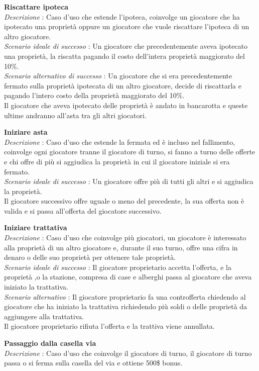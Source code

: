 \documentclass[a4paper]{article}
\begin{document}
\textbf{Riscattare ipoteca}\\
\textit{Descrizione} : Caso d'uso che estende l'ipoteca, coinvolge un giocatore che ha ipotecato una proprietà oppure un giocatore che vuole riscattare l'ipoteca di un altro giocatore.\\
\textit{Scenario ideale di successo} : Un giocatore che precedentemente aveva ipotecato una proprietà, la riscatta pagando il costo dell'intera proprietà maggiorato del 10\%.\\
\textit{Scenario alternativo  di successo} : Un giocatore che si era precedentemente fermato sulla proprietà ipotecata di un altro giocatore, decide di riscattarla e pagando l'intero costo della proprietà maggiorato del 10\%.\\
Il giocatore che aveva ipotecato delle proprietà è andato in bancarotta e queste ultime andranno all'asta tra gli altri giocatori.

\textbf{Iniziare asta}\\
\textit{Descrizione} : Caso d'uso che estende la fermata ed è incluso nel fallimento, coinvolge ogni giocatore tranne il giocatore di turno, si fanno a turno delle offerte e chi offre di più si aggiudica la proprietà in cui il giocatore iniziale si era fermato.\\
\textit{Scenario ideale di successo} : Un giocatore offre più di tutti gli altri e si aggiudica la proprietà.\\
Il giocatore successivo offre uguale o meno del precedente, la sua offerta non è valida e si passa all'offerta del giocatore successivo.

\textbf{Iniziare trattativa}\\
\textit{Descrizione} : Caso d'uso che coinvolge più giocatori, un giocatore è interessato alla proprietà di un altro giocatore e, durante il suo turno, offre una cifra in denaro o delle suo proprietà  per  ottenere tale proprietà.\\
\textit{Scenario ideale di successo} : Il giocatore proprietario accetta l’offerta, e la proprietà ,o la stazione, compresa di case e alberghi passa al giocatore che aveva iniziato la trattativa.\\
\textit{Scenario alternativo} : Il giocatore proprietario fa una controfferta chiedendo al giocatore che ha iniziato la trattativa  richiedendo più soldi o delle proprietà da aggiungere alla trattativa.\\
Il giocatore proprietario rifiuta l’offerta e la trattiva viene annullata.

\textbf{Passaggio dalla casella via}\\
\textit{Descrizione} : Caso d'uso che coinvolge il giocatore di turno, il giocatore di turno passa o si ferma sulla casella del via e ottiene 500\$ bonus.
\end{document}
